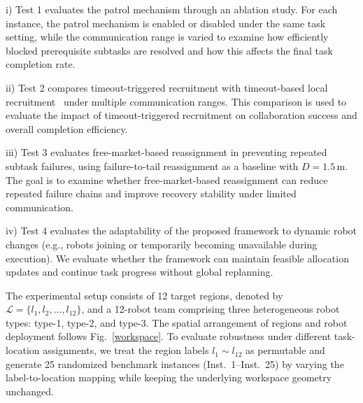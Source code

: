 \documentclass[lettersize,journal]{IEEEtran}
\begin{document}
i) Test 1 evaluates the patrol mechanism through an ablation study. For each instance, the patrol mechanism is enabled or disabled under the same task setting, while the communication range is varied to examine how efficiently blocked prerequisite subtasks are resolved and how this affects the final task completion rate.

ii) Test 2 compares timeout-triggered recruitment with timeout-based local recruitment~\cite{kalempa2021multi} under multiple communication ranges. This comparison is used to evaluate the impact of timeout-triggered recruitment on collaboration success and overall completion efficiency.

iii) Test 3 evaluates free-market-based reassignment in preventing repeated subtask failures, using failure-to-tail reassignment as a baseline with $D=1.5$\,m. The goal is to examine whether free-market-based reassignment can reduce repeated failure chains and improve recovery stability under limited communication.

iv) Test 4 evaluates the adaptability of the proposed framework to dynamic robot changes (e.g., robots joining or temporarily becoming unavailable during execution). We evaluate whether the framework can maintain feasible allocation updates and continue task progress without global replanning.

The experimental setup consists of 12 target regions, denoted by $\mathcal{L} = \{l_1, l_2, \dots, l_{12}\}$, and a 12-robot team comprising three heterogeneous robot types: type-1, type-2, and type-3. The spatial arrangement of regions and robot deployment follows Fig.~\ref{workspace}. To evaluate robustness under different task-location assignments, we treat the region labels $l_1 \sim l_{12}$ as permutable and generate 25 randomized benchmark instances (Inst.~1--Inst.~25) by varying the label-to-location mapping while keeping the underlying workspace geometry unchanged.
\end{document}
